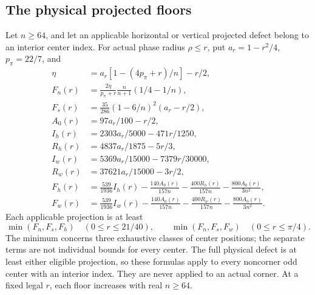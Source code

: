 \subsection{The physical projected floors}

\begin{lemma}\label{lem:projected-floors}
Let $n\geq64$, and let an applicable horizontal or vertical projected
defect belong to an interior center index. For actual phase radius
$\rho\leq r$, put $a_r=1-r^2/4$, $p_\pi=22/7$, and
\begin{align*}
 \eta&=a_r[1-(4p_\pi+r)/n]-r/2,\\
 F_n(r)&=\frac{2\eta}{p_\pi+r}\frac n{n+1}(1/4-1/n),\\
 F_s(r)&=\frac{35}{286}(1-6/n)^2(a_r-r/2),\\
 A_0(r)&=97a_r/100-r/2,\\
 I_h(r)&=2303a_r/5000-471r/1250,\\
 R_h(r)&=4837a_r/1875-5r/3,\\
 I_w(r)&=5369a_r/15000-7379r/30000,\\
 R_w(r)&=37621a_r/15000-3r/2,\\
 F_h(r)&=\frac{539}{1936}I_h(r)-\frac{140A_0(r)}{157n}
               -\frac{400R_h(r)}{157n}-\frac{800A_0(r)}{3n^2},\\
 F_w(r)&=\frac{539}{1936}I_w(r)-\frac{140A_0(r)}{157n}
               -\frac{400R_w(r)}{157n}-\frac{800A_0(r)}{3n^2}.
\end{align*}
Each applicable projection is at least
\begin{equation}\label{eq:three-class-floors}
 \min(F_n,F_s,F_h)\quad(0\leq r\leq21/40),\qquad
 \min(F_n,F_s,F_w)\quad(0\leq r\leq\pi/4).
\end{equation}
The minimum concerns three exhaustive classes of center positions;
the separate terms are not individual bounds for every center.
The full physical defect is at least either eligible projection, so
these formulas apply to every noncorner odd center with an interior
index. They are never applied to an actual corner. At a fixed legal
$r$, each floor increases with real $n\geq64$.
\end{lemma}

